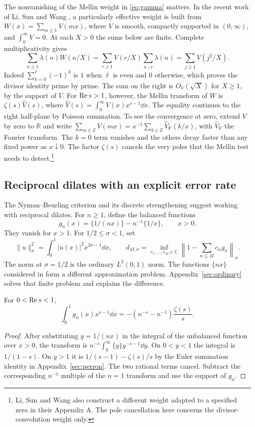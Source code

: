 The nonvanishing of the Mellin weight in \eqref{eq:gamma} matters. In the recent work of Li, Sun and Wang \cite{lsw}, a particularly effective weight is built from \(W(x)=\sum_{m\ge1}V(mx)\), where \(V\) is smooth, compactly supported in \((0,\infty)\), and \(\int_0^\infty V=0\). At each \(X>0\) the sums below are finite. Complete multiplicativity gives
\[
 \sum_{n\ge1}\lambda(n)W(n/X)=
 \sum_{r\ge1}V(r/X)\sum_{n\mid r}\lambda(n)
 =\sum_{j\ge1}V(j^2/X).
\]
Indeed \(\sum_{k=0}^\ell (-1)^k\) is \(1\) when \(\ell\) is even and \(0\) otherwise, which proves the divisor identity prime by prime. The sum on the right is \(O_V(\sqrt X)\) for \(X\ge1\), by the support of \(V\). For \(\operatorname{Re} s>1\), however, the Mellin transform of \(W\) is \(\zeta(s)\widehat V(s)\), where \(\widehat V(s)=\int_0^\infty V(x)x^{s-1}\dd x\). The equality continues to the right half-plane by Poisson summation. To see the convergence at zero, extend \(V\) by zero to \(\mathbb R\) and write \(\sum_{m\in\mathbb Z}V(mx)=x^{-1}\sum_{k\in\mathbb Z}\widehat V_{\mathrm F}(k/x)\), with \(\widehat V_{\mathrm F}\) the Fourier transform. The \(k=0\) term vanishes and the others decay faster than any fixed power as \(x\downarrow0\). The factor \(\zeta(s)\) cancels the very poles that the Mellin test needs to detect.\footnote{Li, Sun and Wang also construct a different weight adapted to a specified zero in their Appendix A. The pole cancellation here concerns the divisor-convolution weight only.}

\subsection{Reciprocal dilates with an explicit error rate}

The Nyman--Beurling criterion and its discrete strengthening \cite{baez,burnol} suggest working with reciprocal dilates. For \(n\ge1\), define the balanced functions
\[
 g_n(x)=\{1/(nx)\}-n^{-1}\{1/x\},\qquad x>0.
\]
They vanish for \(x>1\). For \(1/2\le\sigma<1\), set
\[
 \|u\|_\sigma^2=\int_0^1 |u(x)|^2 x^{2\sigma-1}\dd x,\qquad
 d_{M,\sigma}=\inf_{c_1,\ldots,c_M\in\mathbb C}
      \left\|1-\sum_{n\le M}c_ng_n\right\|_\sigma.
\]
The norm at \(\sigma=1/2\) is the ordinary \(L^2(0,1)\) norm. The functions \(\{nx\}\) considered in \cite{nbdraft} form a different approximation problem. Appendix~\ref{sec:ordinary} solves that finite problem and explains the difference.

\begin{lemma}\label{lem:nbmellin}
For \(0<\operatorname{Re} s<1\),
\[
 \int_0^1 g_n(x)x^{s-1}\dd x
 =-(n^{-s}-n^{-1})\frac{\zeta(s)}{s}.
\]
\end{lemma}
\begin{proof}
After substituting \(y=1/(nx)\) in the integral of the unbalanced function over \(x>0\), the transform is \(n^{-s}\int_0^\infty\{y\}y^{-s-1}\dd y\). On \(0<y<1\) the integral is \(1/(1-s)\). On \(y>1\) it is \(1/(s-1)-\zeta(s)/s\) by the Euler summation identity in Appendix~\ref{sec:perron}. The two rational terms cancel. Subtract the corresponding \(n^{-1}\) multiple of the \(n=1\) transform and use the support of \(g_n\).
\end{proof}

